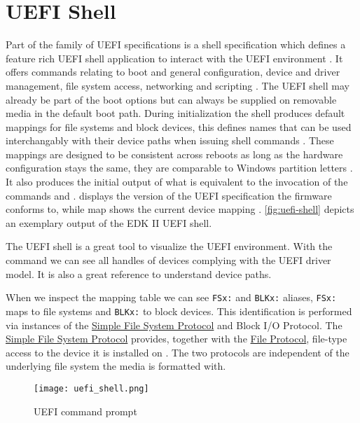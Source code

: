 
\section{\acs{UEFI} Shell}

Part of the family of \ac{UEFI} specifications is a shell specification which defines a feature rich \ac{UEFI} shell application to interact with the \ac{UEFI} environment \cite[Section 1.1]{uefi-shell-spec}.
It offers commands relating to boot and general configuration, device and driver management, file system access, networking \cite[Section 5.1]{uefi-shell-spec} and scripting \cite[Section 4]{uefi-shell-spec}.
The \ac{UEFI} shell may already be part of the boot options but can always be supplied on removable media in the default boot path.
During initialization the shell produces default mappings for file systems and block devices, this defines names that can be used interchangably with their device paths when issuing shell commands \cite[Section 3.7.2]{uefi-shell-spec}.
These mappings are designed to be consistent across reboots as long as the hardware configuration stays the same, they are comparable to Windows partition letters \cite[Appendix A]{uefi-shell-spec}.
It also produces the initial output of what is equivalent to the invocation of the commands  and  \cite[Section 3.3]{uefi-shell-spec}.
 displays the version of the \ac{UEFI} specification the firmware conforms to, while map shows the current device mapping \cite[Section 5.3]{uefi-shell-spec}.
\autoref{fig:uefi-shell} depicts an exemplary output of the \ac{EDK} II \ac{UEFI} shell.

The \ac{UEFI} shell is a great tool to visualize the \ac{UEFI} environment.
With the  command we can see all handles of devices complying with the \ac{UEFI} driver model.
It is also a great reference to understand device paths.


When we inspect the mapping table we can see \lstinline{FSx:} and \lstinline{BLKx:} aliases, \lstinline{FSx:} maps to file systems and \lstinline{BLKx:} to block devices.
This identification is performed via instances of the \hyperref[lst:simple-file-system-protocol]{Simple File System Protocol} and  Block \ac{I/O} Protocol.
The \hyperref[lst:simple-file-system-protocol]{Simple File System Protocol} \cite[Section 13.4]{uefi-spec} provides, together with the \hyperref[lst:simple-file-system-protocol]{File Protocol}, file-type access to the device it is installed on \cite[Section 13.5]{uefi-spec}.
The two protocols are independent of the underlying file system the media is formatted with.




\begin{figure}[htb]
    \centering
    \texttt{[image: uefi\_shell.png]}
    \caption{\ac{UEFI} command prompt}
    \label{fig:uefi-shell}
\end{figure}
